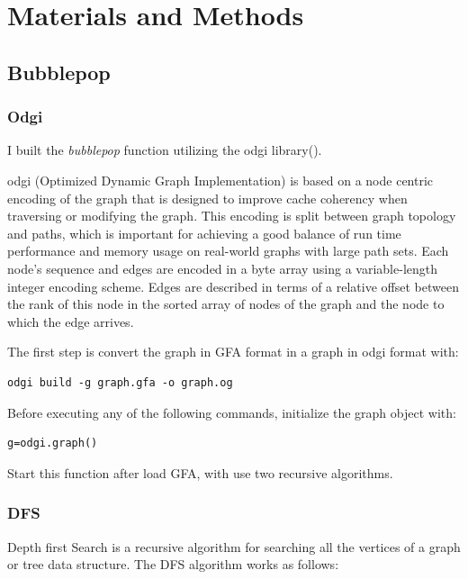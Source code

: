 
\chapter{Materials and Methods}  %

\label{Chapter7} %



\section{Bubblepop} 
\subsection{Odgi}

I built the \textit{bubblepop} function utilizing the odgi library(\cite{eizenga2020succinct}).

odgi (Optimized Dynamic Graph Implementation) is based on a node centric encoding of the graph that is designed to improve cache coherency when traversing or modifying the graph. This encoding is split between graph topology and paths, which is important for achieving a good balance of run time performance and memory usage on real-world graphs with large path sets. Each node’s sequence and edges are encoded in a byte array using a variable-length integer encoding scheme. Edges are described in terms of a relative offset between the rank of this node in the sorted array of nodes of the graph and the node to which the edge arrives.

The first step is convert the graph in GFA format in a graph in odgi format with:

\begin{verbatim}
odgi build -g graph.gfa -o graph.og
\end{verbatim}

Before executing any of the following commands, initialize the graph object with:

\begin{verbatim}
g=odgi.graph()
\end{verbatim}

Start this function after load GFA, with use two recursive algorithms. 

\subsection{DFS}
Depth first Search is a recursive algorithm for searching all the vertices of a graph or tree data structure.
The DFS algorithm works as follows:

